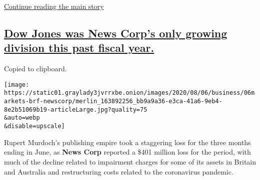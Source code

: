 \protect\hyperlink{after-dfp-ad-mid1}{Continue reading the main story}

\hypertarget{dow-jones-was-news-corps-only-growing-division-this-past-fiscal-year}{%
\subsection{\texorpdfstring{\protect\hyperlink{dow-jones-was-news-corps-only-growing-division-this-past-fiscal-year}{Dow
Jones was News Corp's only growing division this past fiscal
year.}}{Dow Jones was News Corp's only growing division this past fiscal year.}}\label{dow-jones-was-news-corps-only-growing-division-this-past-fiscal-year}}

Copied to clipboard.

\texttt{[image: https://static01.graylady3jvrrxbe.onion/images/2020/08/06/business/06markets-brf-newscorp/merlin\_163892256\_bb9a9a36-e3ca-41a6-9eb4-8e2b51069b19-articleLarge.jpg?quality=75\\\&auto=webp\\\&disable=upscale]}

Rupert Murdoch's publishing empire took a staggering loss for the three
months ending in June, as \textbf{News Corp} reported a \$401 million
loss for the period, with much of the decline related to impairment
charges for some of its assets in Britain and Australia and
restructuring costs related to the coronavirus pandemic.

